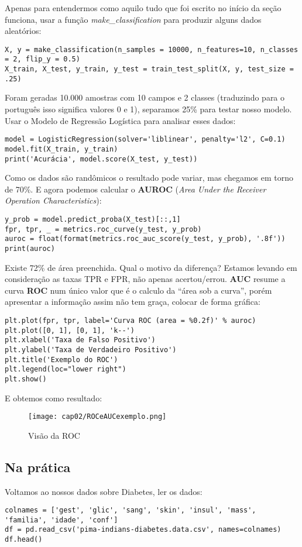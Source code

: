 Apenas para entendermos como aquilo tudo que foi escrito no início da seção funciona, usar a função \textit{make\_classification} para produzir alguns dados aleatórios:
\begin{lstlisting}
X, y = make_classification(n_samples = 10000, n_features=10, n_classes = 2, flip_y = 0.5)
X_train, X_test, y_train, y_test = train_test_split(X, y, test_size = .25)
\end{lstlisting}

Foram geradas 10.000 amostras com 10 campos e 2 classes (traduzindo para o português isso significa valores 0 e 1), separamos 25\% para testar nosso modelo. Usar o Modelo de Regressão Logística para analisar esses dados:
\begin{lstlisting}
model = LogisticRegression(solver='liblinear', penalty='l2', C=0.1)
model.fit(X_train, y_train)
print('Acurácia', model.score(X_test, y_test))
\end{lstlisting}

Como os dados são randômicos o resultado pode variar, mas chegamos em torno de 70\%. E agora podemos calcular o \textbf{AUROC} (\textit{Area Under the Receiver Operation Characteristics}):
\begin{lstlisting}
y_prob = model.predict_proba(X_test)[::,1]
fpr, tpr, _ = metrics.roc_curve(y_test, y_prob)
auroc = float(format(metrics.roc_auc_score(y_test, y_prob), '.8f'))
print(auroc)
\end{lstlisting}

Existe 72\% de área preenchida. Qual o motivo da diferença? Estamos levando em consideração as taxas TPR e FPR, não apenas acertou/errou. \textbf{AUC} resume a curva \textbf{ROC} num único valor que é o calculo da “área sob a curva”, porém apresentar a informação assim não tem graça, colocar de forma gráfica:
\begin{lstlisting}
plt.plot(fpr, tpr, label='Curva ROC (area = %0.2f)' % auroc)
plt.plot([0, 1], [0, 1], 'k--')
plt.xlabel('Taxa de Falso Positivo')
plt.ylabel('Taxa de Verdadeiro Positivo')
plt.title('Exemplo do ROC')
plt.legend(loc="lower right")
plt.show()
\end{lstlisting}

E obtemos como resultado:
\begin{figure}[H]
	\centering
	\texttt{[image: cap02/ROCeAUCexemplo.png]}
	\caption{Visão da ROC}
\end{figure}

\subsection{Na prática}
Voltamos ao nossos dados sobre Diabetes, ler os dados:
\begin{lstlisting}
colnames = ['gest', 'glic', 'sang', 'skin', 'insul', 'mass', 'familia', 'idade', 'conf']
df = pd.read_csv('pima-indians-diabetes.data.csv', names=colnames)
df.head()
\end{lstlisting}

